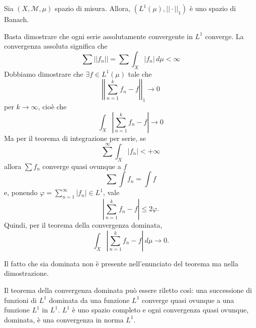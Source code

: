 \documentclass[a4paper]{article}
\begin{document}
\begin{radioactive}
\begin{snippettheorem}{}
    Sia \((X, \mathcal M, \mu)\) spazio di misura.
    Allora, \((L^1(\mu), ||\cdot||_1)\) è uno spazio di Banach.
\end{snippettheorem}
\end{radioactive}

\begin{radioactive}
\begin{snippetproof}{}
    Basta dimostrare che ogni serie assolutamente convergente in \(L^1\) converge.
    La convergenza assoluta significa che
    \[
        \sum ||f_n|| = \sum \int_X |f_n|\,d\mu < \infty
    \]
    Dobbiamo dimostrare che \(\exists f \in L^1(\mu)\) tale che
    \[
        \left|\left|
        \sum_{n=1}^k f_n - f
        \right|\right|_1 \to 0
    \]
    per \(k\to\infty\), cioè che
    \[
        \int_X \left|\sum_{n=1}^k f_n - f\right| \to 0
    \]
    Ma per il teorema di integrazione per serie, se
    \[
        \sum^\infty \int_X |f_n| < +\infty
    \]
    allora \(\sum f_n\) converge quasi ovunque a \(f\)
    \[
        \sum \int f_n = \int f
    \]
    e, ponendo \(\varphi=\sum_{n=1}^{\infty}|f_n|\in L^1\), vale
    \[
        \left|\sum_{n=1}^k f_n-f\right|\leq2\varphi.
    \]
    Quindi, per il teorema della convergenza dominata,
    \[
        \int_X\left|\sum_{n=1}^k f_n-f\right|\,d\mu\to0.
    \]
\end{snippetproof}
\end{radioactive}

\begin{radioactive}
Il fatto che sia dominata non è presente nell'enunciato del teorema ma nella dimostrazione.
\end{radioactive}

\begin{radioactive}
Il teorema della convergenza dominata può essere
riletto così: una successione di funzioni di \(L^1\) dominata
da una funzione \(L^1\) converge quasi ovunque a una funzione \(L^1\) in \(L^1\).
\(L^1\) è uno spazio completo e ogni convergenza quasi ovunque, dominata, è una convergenza in norma \(L^1\).
\end{radioactive}
\end{document}
